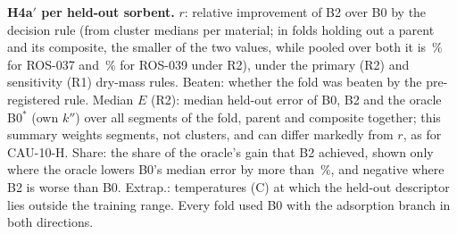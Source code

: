 \documentclass[12pt]{article}
\newcommand{\kpp}{k''}
\begin{document}
\begin{table}[!tbp]
\centering
\small
\caption{\textbf{H4a$'$ per held-out sorbent.} $r$: relative improvement of B2 over B0 by the decision rule (from
cluster medians per material; in folds holding out a parent and its composite, the smaller of the two values, while
pooled over both it is \,\% for ROS-037 and \,\% for ROS-039 under R2),
under the primary (R2) and sensitivity (R1) dry-mass rules. Beaten: whether the fold was beaten by the pre-registered rule.
Median $E$ (R2): median held-out error of B0, B2 and the oracle B0$^{*}$ (own $\kpp$) over all segments of the fold,
parent and composite together; this summary weights segments, not clusters, and can differ markedly from $r$, as for
CAU-10-H. Share: the share of the oracle's gain that B2 achieved, shown only where the oracle lowers B0's median error by more
than \,\%, and negative where B2 is worse than B0. Extrap.: temperatures (\textdegree C) at which the held-out descriptor lies
outside the training range. Every fold used B0 with the adsorption branch in both directions.}
\label{tab:h4a}

\end{table}
\end{document}
